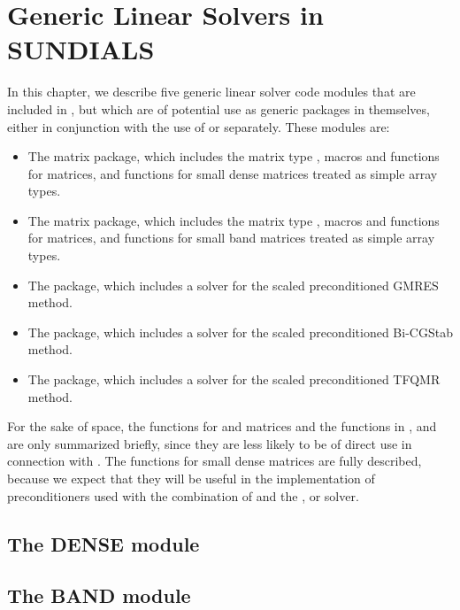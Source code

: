 \chapter{Generic Linear Solvers in SUNDIALS}\label{s:gen_linsolv}
In this chapter, we describe five generic linear solver code modules that 
are included in {\cvode}, but which are of potential use as generic packages in
themselves, either in conjunction with the use of {\cvode} or separately.
These modules are:
\begin{itemize}
\item The {\dense} matrix package, which includes the matrix type ,
      macros and functions for  matrices, and functions
      for small dense matrices treated as simple array types.
\item The {\band} matrix package, which includes the matrix type ,
      macros and functions for  matrices, and functions
      for small band matrices treated as simple array types.
\item The {\spgmr} package, which includes a solver for the scaled
      preconditioned GMRES method.
\item The {\spbcg} package, which includes a solver for the scaled
      preconditioned Bi-CGStab method.
\item The {\sptfqmr} package, which includes a solver for the scaled
      preconditioned TFQMR method.
\end{itemize}

For the sake of space, the functions for  and
 matrices and the functions in {\spgmr}, {\spbcg} and {\sptfqmr}
are only summarized briefly, since they are less likely to be of direct use
in connection with {\cvode}.  The functions for small dense matrices are fully
described, because we expect that they will be useful in the
implementation of preconditioners used with the combination of {\cvode}
and the {\cvspgmr}, {\cvspbcg} or {\cvsptfqmr} solver.

\section{The DENSE module}\label{ss:dense}


\section{The BAND module}\label{ss:band}


